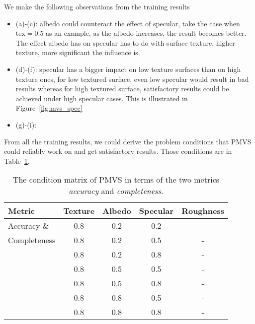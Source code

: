 We make the following observations from the training results
\begin{itemize}
\item (a)-(c): albedo could counteract the effect of specular, take the case when $\text{tex}=0.5$ as an example, as the albedo increases, the result becomes better. The effect albedo has on specular has to do with surface texture, \ie higher texture, more significant the influence is.
\item (d)-(f): specular has a bigger impact on low texture surfaces than on high texture ones, \ie for low textured surface, even low specular would result in bad results whereas for high textured surface, satisfactory results could be achieved under high specular cases. This is illustrated in Figure~\ref{fig:mvs_spec}
\item (g)-(i): 
\end{itemize}

From all the training results, we could derive the problem conditions that PMVS could reliably work on and get satisfactory results. Those conditions are in Table~\ref{tab:mvs_traing_result}.
\begin{table}[!htbp]
  \centering
  \begin{tabular}{l*{4}{c}}
  \hline
  \textbf{Metric} & Texture & Albedo & Specular & Roughness\\
  \hline
  Accuracy \&  & 0.8 & 0.2 & 0.2 & -\\
  Completeness & 0.8 & 0.2 & 0.5 & -\\
               & 0.8 & 0.2 & 0.8 & -\\
               & 0.8 & 0.5 & 0.5 & -\\
               & 0.8 & 0.5 & 0.8 & -\\
               & 0.8 & 0.8 & 0.5 & -\\
               & 0.8 & 0.8 & 0.8 & -\\
  \hline
  \end{tabular}
  \caption{The condition matrix of PMVS in terms of the two metrics \textit{accuracy} and \textit{completeness}.}
  \label{tab:mvs_traing_result}
\end{table}

